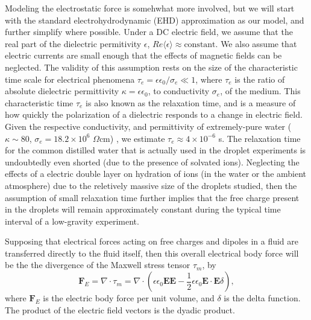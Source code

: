 \documentclass[a4paper, 12pt]{article}
\begin{document}
Modeling the electrostatic force is somehwhat more involved, but we will start with the standard electrohydrodynamic (EHD) approximation \cite{saville_electrohydrodynamics:taylor-melcher_1997} as our model, and further simplify where possible. Under a DC electric field, we assume that the real part of the dielectric permitivity $\epsilon$, $Re \langle \epsilon \rangle \approx  \mbox{constant}$. We also assume that electric currents are small enough that the effects of magnetic fields can be neglected. The validity of this assumption rests on the size of the characteristic time scale for electrical phenomena $\tau_e = \epsilon \epsilon_0/\sigma_e \ll 1$, where $\tau_e$ is the ratio of absolute dielectric permittivity $\kappa = \epsilon \epsilon_0$, to conductivity $\sigma_e$, of the medium. This characteristic time $\tau_e$ is also known as the relaxation time, and is a measure of how quickly the polarization of a dielectric responds to a change in electric field. Given the respective conductivity, and permittivity of extremely-pure water ($ \kappa \sim 80$, $\sigma_e = 18.2 \times 10^{6}$ $\Omega\mbox{cm}$) \cite{yatsuzuka_electrification_1994}, we estimate $\tau_e \approx 4 \times 10^{-6}$ s. The relaxation time for the common distilled water that is actually used in the droplet experiments is undoubtedly even shorted (due to the presence of solvated ions). Neglecting the effects of a electric double layer on hydration of ions (in the water or the ambient atmosphere) due to the reletively massive size of the droplets studied, then the assumption of small relaxation time further implies that the free charge present in the droplets will remain approximately constant during the typical time interval of a low-gravity experiment.

Supposing that electrical forces acting on free charges and dipoles in a fluid are transferred directly to the fluid itself, then this overall electrical body force will be the the divergence of the Maxwell stress tensor $\tau_m $, by
\[ \mathbf{F}_E = \nabla \cdot \tau_m = \nabla \cdot \left( \epsilon \epsilon_0 \mathbf{E} \mathbf{E} - \frac{1}{2} \epsilon \epsilon_0 \mathbf{E} \cdot \mathbf{E} \delta \right) ,\]
where $\mathbf{F}_E$ is the electric body force per unit volume, and $\delta$ is the delta function. The product of the electric field vectors is the dyadic product.  
\end{document}
